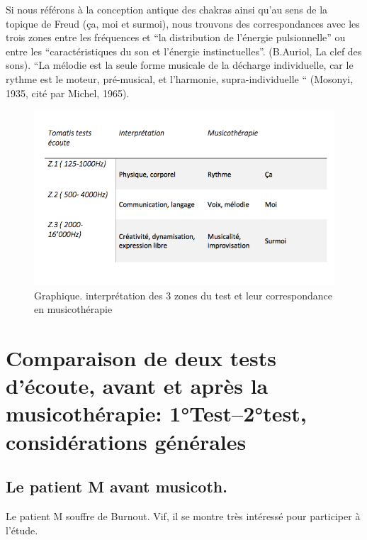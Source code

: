 Si nous référons à la conception antique des chakras ainsi qu'au sens de la
topique de Freud (ça, moi et surmoi), nous trouvons des correspondances
avec les trois zones entre les
fréquences et ``la distribution de l'énergie pulsionnelle'' ou entre
les 
``caractéristiques du son et l'énergie instinctuelles''. (B.Auriol, La
clef des sons).
``La mélodie est la seule forme musicale de la décharge individuelle, car le rythme est le moteur, pré-musical, et l'harmonie, supra-individuelle `` (Mosonyi, 1935, cité par Michel, 1965).

 

\begin{figure}
	\centering
	\includegraphics[width=0.7\linewidth]{images/testinterpmusico}
	\caption[ L'interprétation des 3 zones et leur correspondance
        en musicothérapie]{Graphique. interprétation des 3 zones du
          test et leur correspondance en musicothérapie}
       
	\label{graphiquecolonnetestmusico}
      \end{figure}











      


  

\section{Comparaison de deux tests d'écoute, avant et après la musicothérapie: 1°Test--2°test, considérations générales}
	
 	
\subsection{Le patient M avant musicoth.}

 	Le patient M souffre de Burnout. Vif, il se montre très
        intéressé pour participer à l'étude.
 
